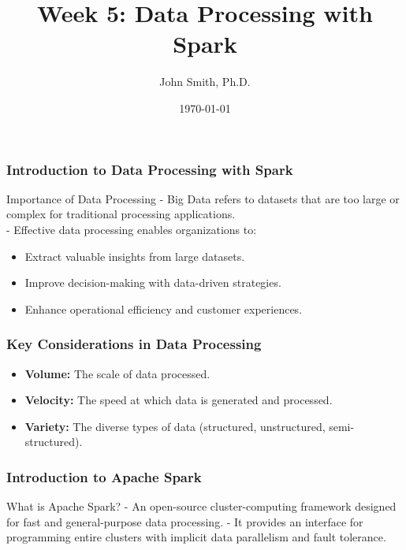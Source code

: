 \documentclass[aspectratio=169]{beamer}
\title[Data Processing with Spark]{Week 5: Data Processing with Spark}
\author[J. Smith]{John Smith, Ph.D.}
\institute[University Name]{
  Department of Computer Science\\
  University Name\\
  Email: email@university.edu\\
  Website: www.university.edu
}
\date{\today}
\begin{document}
\frame{\titlepage}

\begin{frame}[fragile]
    \frametitle{Introduction to Data Processing with Spark}
    \begin{block}{Importance of Data Processing}
        - Big Data refers to datasets that are too large or complex for traditional processing applications.\\
        - Effective data processing enables organizations to:
        \begin{itemize}
            \item Extract valuable insights from large datasets.
            \item Improve decision-making with data-driven strategies.
            \item Enhance operational efficiency and customer experiences.
        \end{itemize}
    \end{block}
\end{frame}

\begin{frame}[fragile]
    \frametitle{Key Considerations in Data Processing}
    \begin{itemize}
        \item \textbf{Volume:} The scale of data processed.
        \item \textbf{Velocity:} The speed at which data is generated and processed.
        \item \textbf{Variety:} The diverse types of data (structured, unstructured, semi-structured).
    \end{itemize}
\end{frame}

\begin{frame}[fragile]
    \frametitle{Introduction to Apache Spark}
    \begin{block}{What is Apache Spark?}
        - An open-source cluster-computing framework designed for fast and general-purpose data processing.
        - It provides an interface for programming entire clusters with implicit data parallelism and fault tolerance.
    \end{block}
\end{frame}
\end{document}
